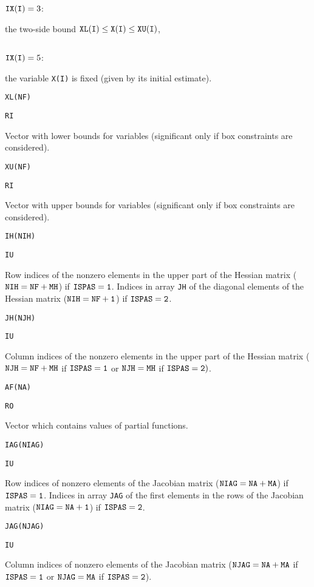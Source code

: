 \documentclass{esub2acm}
\begin{document}
\noindent\parbox{30mm}{$\;$}\parbox{24mm}{${\tt IX(I)}=3$:}\parbox[t]{101mm}{
  the two-side bound $\tt XL(I)\le \tt X(I)\le \tt XU(I)$,}
  \par
\noindent\parbox{30mm}{$\;$}\parbox{24mm}{${\tt IX(I)}=5$:}\parbox[t]{101mm}{
  the variable {\tt X(I)} is fixed (given by its initial estimate).}
  \par\vspace{2mm}
\noindent\parbox{20mm}{\tt XL(NF)}\parbox{10mm}{\tt RI}\parbox[t]{125mm}{
  Vector with lower bounds for variables (significant only if box
  constraints are considered).}
  \par\vspace{2mm}
\noindent\parbox{20mm}{\tt XU(NF)}\parbox{10mm}{\tt RI}\parbox[t]{125mm}{
  Vector with upper bounds for variables (significant only if box
  constraints are considered).}
  \par\vspace{2mm}
\noindent\parbox{20mm}{\tt IH(NIH)}\parbox{10mm}{\tt IU}\parbox[t]{125mm}{
  Row indices of the nonzero elements in the upper part of the Hessian
  matrix (${\tt NIH=NF+MH}$) if ${\tt ISPAS=1}$. Indices in array {\tt JH} of
  the diagonal elements of the Hessian matrix (${\tt NIH=NF+1}$) if
  ${\tt ISPAS=2}$.}
  \par\vspace{2mm}
\noindent\parbox{20mm}{\tt JH(NJH)}\parbox{10mm}{\tt IU}\parbox[t]{125mm}{
  Column indices of the nonzero elements in the upper part of the Hessian
  matrix (${\tt NJH=NF+MH}$ if ${\tt ISPAS=1}$ or ${\tt NJH=MH}$ if ${\tt ISPAS=2})$.}
  \par\vspace{2mm}
\noindent\parbox{20mm}{\tt AF(NA)}\parbox{10mm}{\tt RO}\parbox[t]{125mm}{
  Vector which contains values of partial functions.}
  \par\vspace{2mm}
\noindent\parbox{20mm}{\tt IAG(NIAG)}\parbox{10mm}{\tt IU}\parbox[t]{125mm}{
  Row indices of nonzero elements of the Jacobian matrix (${\tt NIAG=NA+MA}$)
  if ${\tt ISPAS=1}$. Indices in array {\tt JAG} of the first elements in
  the rows of the Jacobian matrix (${\tt NIAG=NA+1}$) if ${\tt ISPAS=2}$.}
  \par\vspace{2mm}
\noindent\parbox{20mm}{\tt JAG(NJAG)}\parbox{10mm}{\tt IU}\parbox[t]{125mm}{
  Column indices of nonzero elements of the Jacobian matrix (${\tt NJAG=NA+MA}$
  if ${\tt ISPAS=1}$ or ${\tt NJAG=MA}$ if ${\tt ISPAS=2}$).}
  \par\vspace{2mm}
\end{document}
